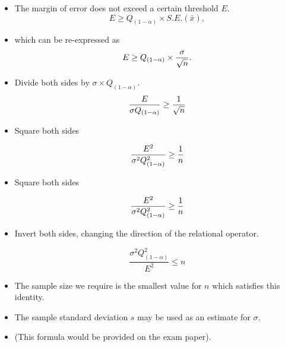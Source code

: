 \begin{multicols}{2}

\begin{itemize}

\item The margin of error does not exceed a certain threshold $E$.
\[ E \geq Q_{(1-\alpha)} \times S.E.(\bar{x}), \]

\item which can be re-expressed as
\[E \geq Q_{(1-\alpha)} \times {\sigma \over \sqrt{n} }.\]

\item Divide both sides by $\sigma \times Q_{(1-\alpha)}$.
\[ \frac{E}{\sigma Q_{(1-\alpha)}} \geq {1 \over \sqrt{n} } \]

\item Square both sides

\[ \frac{E^2}{\sigma^2 Q_{(1-\alpha)}^2} \geq {1 \over n } \]



\item Square both sides

\[ \frac{E^2}{\sigma^2 Q^2_{(1-\alpha)}} \geq {1 \over n } \]


\item Invert both sides, changing the direction of the relational operator.

\[ \frac{\sigma^2 Q^2_{(1-\alpha)}}{E^2} \leq n \]
\end{itemize}

\end{multicols}
\begin{itemize}
\item The sample size we require is the smallest value for $n$ which satisfies this identity.
\item The sample standard deviation $s$ may be used as an estimate for $\sigma$.
\item (This formula would be provided on the exam paper).
\end{itemize}






